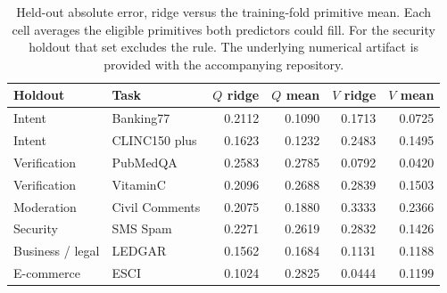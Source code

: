 \begin{table}[htbp]
\centering
\small
\setlength{\tabcolsep}{5pt}
\caption{Held-out absolute error, ridge versus the training-fold primitive mean. Each cell averages the eligible primitives both predictors could fill. For the security holdout that set excludes the rule. The underlying numerical artifact is provided with the accompanying repository.}
\label{tab:selector}
\begin{tabular}{@{}llrrrr@{}}
\toprule
Holdout & Task & \(Q\) ridge & \(Q\) mean & \(V\) ridge & \(V\) mean \\
\midrule
Intent & Banking77 & 0.2112 & 0.1090 & 0.1713 & 0.0725 \\
Intent & CLINC150 plus & 0.1623 & 0.1232 & 0.2483 & 0.1495 \\
Verification & PubMedQA & 0.2583 & 0.2785 & 0.0792 & 0.0420 \\
Verification & VitaminC & 0.2096 & 0.2688 & 0.2839 & 0.1503 \\
Moderation & Civil Comments & 0.2075 & 0.1880 & 0.3333 & 0.2366 \\
Security & SMS Spam & 0.2271 & 0.2619 & 0.2832 & 0.1426 \\
Business / legal & LEDGAR & 0.1562 & 0.1684 & 0.1131 & 0.1188 \\
E-commerce & ESCI & 0.1024 & 0.2825 & 0.0444 & 0.1199 \\
\bottomrule
\end{tabular}
\end{table}
